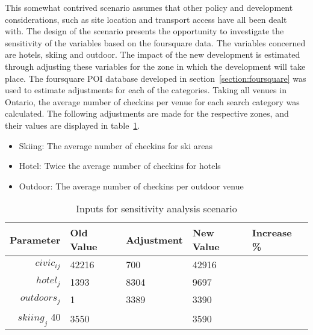 This somewhat contrived scenario assumes that other policy and development considerations, such as site location and transport access have all been dealt with. The design of the scenario presents the opportunity to investigate the sensitivity of the  variables based on the foursquare data. The variables concerned are hotels, skiing and outdoor. The impact of the new development is estimated through adjusting these variables for the zone in which the development will take place. The foursquare POI database developed in section~\ref{section:foursquare} was used to estimate adjustments for each of the categories. Taking all venues in Ontario, the average number of checkins per venue for each search category was calculated. The following adjustments are made for the respective zones, and their values are displayed in table~\ref{table:scenario-inputs}.

\begin{itemize}
\item Skiing: The average number of checkins for ski areas
\item Hotel: Twice the average number of checkins for hotels
\item Outdoor: The average number of checkins per outdoor venue
\end{itemize}


\begin{table}[H]
\centering
\caption{Inputs for sensitivity analysis scenario}
\label{table:scenario-inputs}
\begin{tabular}{@{}rllll@{}}
  \toprule
 Parameter & Old Value & Adjustment & New Value & Increase \% \\ \midrule
  $civic_{ij}$ & 42216 & 700 & 42916 & \\ 
  $hotel_j$ & 1393  & 8304 & 9697 & \\ 
  $outdoors_j$  & 1 & 3389 & 3390 & \\ 
  $skiing_j$ 40  & 3550 &  & 3590 &\\ 
   \bottomrule
\end{tabular}
\end{table}





